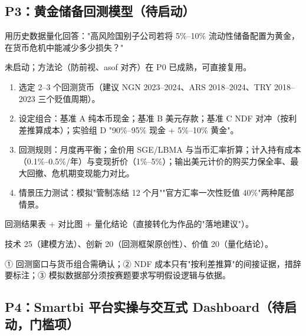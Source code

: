 \documentclass[UTF8,12pt]{ctexart}
\begin{document}
\subsection{P3：黄金储备回测模型（待启动）}

\begin{description}[style=nextline]
\item[目标] 用历史数据量化回答："高风险国别子公司若将 5\%--10\% 流动性储备配置为黄金，在货币危机中能减少多少损失？"
\item[现状] 未启动；方法论（防前视、asof 对齐）在 P0 已成熟，可直接复用。
\item[具体动作]
\begin{enumerate}
\item 选定 2--3 个回测货币（建议 NGN 2023--2024、ARS 2018--2024、TRY 2018--2023 三个贬值周期）。
\item 设定组合：基准 A 纯本币现金；基准 B 美元存款；基准 C NDF 对冲（按利差推算成本）；实验组 D "90\%--95\% 现金 + 5\%--10\% 黄金"。
\item 回测规则：月度再平衡；金价用 SGE/LBMA 与当币汇率折算；计入持有成本（0.1\%--0.5\%/年）与变现折价（1\%--5\%）；输出美元计价的购买力保全率、最大回撤、危机期变现能力对比。
\item 情景压力测试：模拟"管制冻结 12 个月""官方汇率一次性贬值 40\%"两种尾部情景。
\end{enumerate}
\item[产出物] 回测结果表 + 对比图 + 量化结论（直接转化为作品的"落地建议"）。
\item[对应评分项] 技术 25（建模方法）、创新 20（回测框架原创性）、价值 20（量化结论）。
\item[风险与待决问题] ① 回测窗口与货币组合需确认；② NDF 成本只有"按利差推算"的间接证据，措辞要标注；③ 模拟数据部分须按赛题要求写明假设逻辑与依据。
\end{description}

\subsection{P4：Smartbi 平台实操与交互式 Dashboard（待启动，门槛项）}
\end{document}
